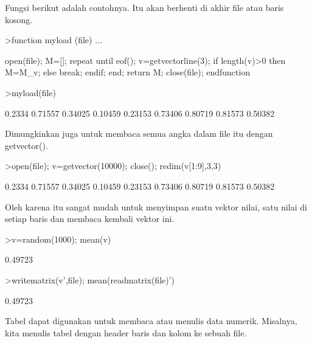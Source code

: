 \documentclass{article}
\begin{document}
\begin{eulernotebook}
\begin{eulercomment}
\begin{eulercomment}
\begin{eulercomment}
\begin{eulercomment}
\begin{eulercomment}
\begin{eulercomment}
\begin{eulercomment}
\begin{eulercomment}
\begin{eulercomment}
\begin{eulercomment}
\begin{eulercomment}
\begin{eulercomment}
\begin{eulercomment}
\begin{eulercomment}
\begin{eulercomment}
Fungsi berikut adalah contohnya. Itu akan berhenti di akhir file atau
baris kosong.
\end{eulercomment}
\begin{eulerprompt}
>function myload (file) ...
\end{eulerprompt}
\begin{eulerudf}
  open(file);
  M=[];
  repeat
     until eof();
     v=getvectorline(3);
     if length(v)>0 then M=M_v; else break; endif;
  end;
  return M;
  close(file);
  endfunction
\end{eulerudf}
\begin{eulerprompt}
>myload(file)
\end{eulerprompt}
\begin{euleroutput}
     0.2334   0.71557   0.34025 
    0.10459   0.23153   0.73406 
    0.80719   0.81573   0.50382 
\end{euleroutput}
\begin{eulercomment}
Dimungkinkan juga untuk membaca semua angka dalam file itu dengan
getvector().
\end{eulercomment}
\begin{eulerprompt}
>open(file); v=getvector(10000); close(); redim(v[1:9],3,3)
\end{eulerprompt}
\begin{euleroutput}
     0.2334   0.71557   0.34025 
    0.10459   0.23153   0.73406 
    0.80719   0.81573   0.50382 
\end{euleroutput}
\begin{eulercomment}
Oleh karena itu sangat mudah untuk menyimpan suatu vektor nilai, satu
nilai di setiap baris dan membaca kembali vektor ini.
\end{eulercomment}
\begin{eulerprompt}
>v=random(1000); mean(v)
\end{eulerprompt}
\begin{euleroutput}
  0.49723
\end{euleroutput}
\begin{eulerprompt}
>writematrix(v',file); mean(readmatrix(file)')
\end{eulerprompt}
\begin{euleroutput}
  0.49723
\end{euleroutput}
\begin{eulercomment}
Tabel dapat digunakan untuk membaca atau menulis data numerik.
Misalnya, kita menulis tabel dengan header baris dan kolom ke sebuah
file.
\end{eulercomment}

\end{eulercomment}
\end{eulercomment}
\end{eulercomment}
\end{eulercomment}
\end{eulercomment}
\end{eulercomment}
\end{eulercomment}
\end{eulercomment}
\end{eulercomment}
\end{eulercomment}
\end{eulercomment}
\end{eulercomment}
\end{eulercomment}
\end{eulercomment}
\end{eulernotebook}
\end{document}
